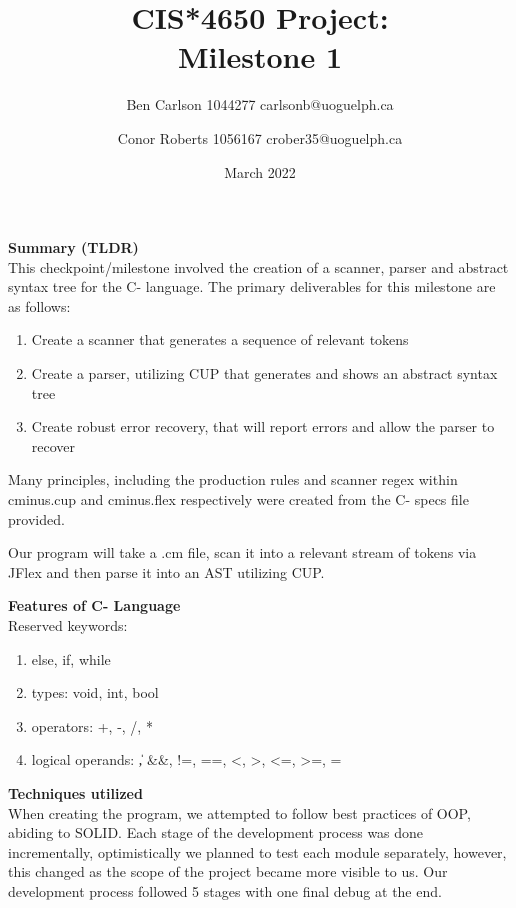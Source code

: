 \documentclass[12pt]{extarticle}
\title{CIS*4650 Project:\\ Milestone 1}
\author{
    Ben Carlson 1044277 carlsonb@uoguelph.ca \\
    \and 
    Conor Roberts 1056167  crober35@uoguelph.ca \\
}
\date{March 2022}
\begin{document}
\maketitle
\pagebreak
\textbf{Summary (TLDR)}\\

This checkpoint/milestone involved the creation of a scanner, parser and abstract syntax tree for the C- language.
The primary deliverables for this milestone are as follows:

\begin{enumerate}
    \item Create a scanner that generates a sequence of relevant tokens
    \item Create a parser, utilizing CUP that generates and shows an abstract syntax tree
    \item Create robust error recovery, that will report errors and allow the parser to recover
\end{enumerate}

Many principles, including the production rules and scanner regex within cminus.cup and cminus.flex respectively were created from the C- specs file provided.

Our program will take a .cm file, scan it into a relevant stream of tokens via JFlex and then parse it into an AST utilizing CUP.

\textbf{Features of C- Language}
\\ Reserved keywords:
\begin{enumerate}
    \item else, if, while
    \item types: void, int, bool
    \item operators: +, -, /, *
    \item logical operands: \|, \&\&, !=, ==, <, >, <=, >=, =
\end{enumerate}

\pagebreak
\textbf{Techniques utilized}
\\
When creating the program, we attempted to follow best practices of OOP, abiding to SOLID. Each stage of the development process was done incrementally, optimistically we planned to test each module separately, however, this changed as the scope of the project became more visible to us. Our development process followed 5 stages with one final debug at the end.
\end{document}
